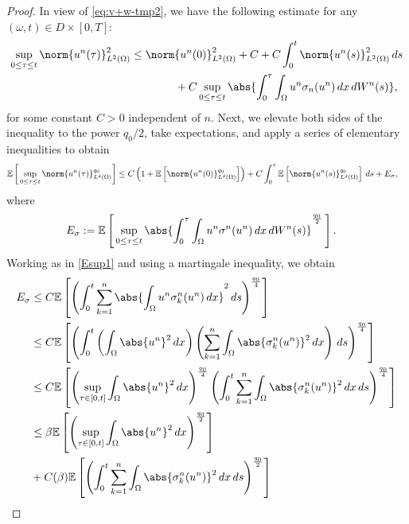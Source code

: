 \documentclass[10pt,number,preprint,times]{elsarticle}
\numberwithin{equation}{section} %
\newcommand{\E}{\ensuremath{\Bbb{E}}}
\begin{document}
\begin{proof}
{
In view of \eqref{eq:v+w-tmp2}, we have the following 
estimate for any $(\omega,t)\in D \times [0,T]$: 
\begin{align*}
	\sup_{0\le \tau\le t}\norm{u^n(\tau)}_{L^2(\Omega)}^2 
	 &\leq
	\norm{u^n(0)}_{L^2(\Omega)}^2 
	+ C+ C\int_0^t \norm{u^n(s)}_{L^2(\Omega)}^2 \,ds
	\\ & \quad \qquad\quad
	+C\sup_{0\le \tau\le t}\abs{\int_0^{\tau}\int_{\Omega} 
	u^n \sigma_n(u^n) \,dx \,dW^{n}(s)},
\end{align*}
for some constant $C>0$ independent of $n$. Next, we elevate both sides of the inequality to the power 
 $q_0/2$, take expectations, and apply a series of elementary inequalities to obtain 
\begin{equation}\label{eq:pmoment}
	\begin{split}
		\E\left[ \,\sup_{0\le \tau\le t}
		\norm{u^n(\tau)}_{L^2(\Omega)}^{q_0}\right]  &\le 
		C\left (1+\E\left[ \norm{u^n(0)}_{L^2(\Omega)}^{q_0}\right] \right)
		+C\int_0^\tau \E\left[ 
		\norm{u^n(s)}_{L^2(\Omega)}^{q_0}\right] \,ds
		+ E_\sigma,
	\end{split}
\end{equation}
where
\begin{align*}
	E_\sigma & := \E\left[\, \sup_{0\le \tau\le t}\abs{\int_0^{\tau}
	\int_{\Omega} u^n \sigma^n(u^n) \,dx \,dW^{n}(s)}^{\frac{q_0}{2}}\,\right].
\end{align*}
Working as in \eqref{Esup1} and using a martingale inequality, we obtain
\begin{equation}\label{Esup-vq0}
	\begin{split}
		E_\sigma & \le C \E \left[ \left(\int_0^t \sum_{k=1}^n 
		\abs{\int_{\Omega} u^n \sigma^n_k(u^n) \,dx}^2 \,ds\right)^{\frac{q_0}{4}} \right]
		\\ & \le C \E \left[\left( \int_0^t  
		\left(\int_{\Omega} \abs{u^n}^2\,dx\right) 
		\left(\sum_{k=1}^n\int_{\Omega} \abs{\sigma^n_k(u^n)}^2 \,dx 
		\right)\,ds\right)^{\frac{q_0}{4}} \right] \\ & \le C \E \left[
		\left(\sup_{\tau\in [0,t]}\int_{\Omega} \abs{u^n}^2\,dx\right)^{\frac{q_0}{4}}
		\left( \int_0^t\sum_{k=1}^n\int_{\Omega} 
		\abs{\sigma^n_k(u^n)}^2 \,dx\,ds \right)^{\frac{q_0}{4}}\right]
		\\ & \le \beta
		\E \left[\left(\sup_{\tau\in [0,t]}\int_{\Omega} 
		\abs{u^n}^2\,dx\right)^{\frac{q_0}{2}}\right]
		\\ &+C(\beta)\E\left[\left( \int_0^t\sum_{k=1}^n\int_{\Omega} 
		\abs{\sigma^n_k(u^n)}^2 \,dx\,ds \right)^{\frac{q_0}{2}}\right]

\end{split}
\end{equation}}
\end{proof}
\end{document}
